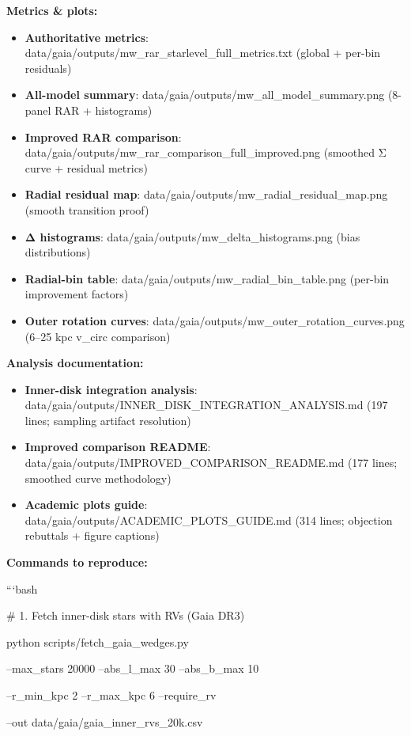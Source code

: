 \documentclass[11pt,a4paper]{article}
\begin{document}
\textbf{Metrics \& plots:}

\begin{itemize}
\item \textbf{Authoritative metrics}: data/gaia/outputs/mw\_rar\_starlevel\_full\_metrics.txt (global + per-bin residuals)
\item \textbf{All-model summary}: data/gaia/outputs/mw\_all\_model\_summary.png (8-panel RAR + histograms)
\item \textbf{Improved RAR comparison}: data/gaia/outputs/mw\_rar\_comparison\_full\_improved.png (smoothed Σ curve + residual metrics)
\item \textbf{Radial residual map}: data/gaia/outputs/mw\_radial\_residual\_map.png (smooth transition proof)
\item \textbf{Δ histograms}: data/gaia/outputs/mw\_delta\_histograms.png (bias distributions)
\item \textbf{Radial-bin table}: data/gaia/outputs/mw\_radial\_bin\_table.png (per-bin improvement factors)
\item \textbf{Outer rotation curves}: data/gaia/outputs/mw\_outer\_rotation\_curves.png (6–25 kpc v\_circ comparison)
\end{itemize}


\textbf{Analysis documentation:}

\begin{itemize}
\item \textbf{Inner-disk integration analysis}: data/gaia/outputs/INNER\_DISK\_INTEGRATION\_ANALYSIS.md (197 lines; sampling artifact resolution)
\item \textbf{Improved comparison README}: data/gaia/outputs/IMPROVED\_COMPARISON\_README.md (177 lines; smoothed curve methodology)
\item \textbf{Academic plots guide}: data/gaia/outputs/ACADEMIC\_PLOTS\_GUIDE.md (314 lines; objection rebuttals + figure captions)
\end{itemize}


\textbf{Commands to reproduce:}

```bash

\# 1. Fetch inner-disk stars with RVs (Gaia DR3)

python scripts/fetch\_gaia\_wedges.py \

  --max\_stars 20000 --abs\_l\_max 30 --abs\_b\_max 10 \

  --r\_min\_kpc 2 --r\_max\_kpc 6 --require\_rv \

  --out data/gaia/gaia\_inner\_rvs\_20k.csv
\end{document}
